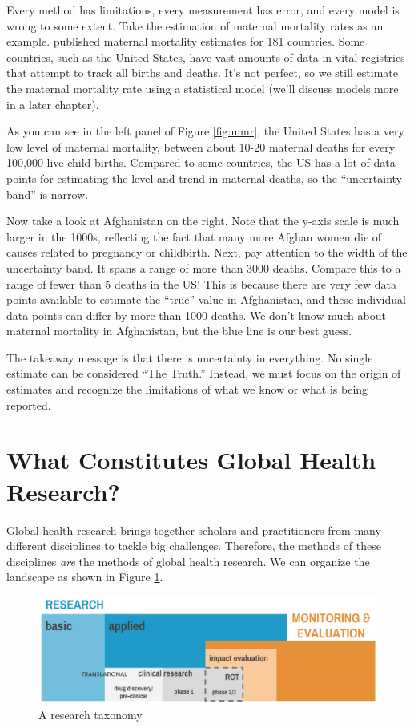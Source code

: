 \documentclass[justified,twoside,symmetric,]{tufte-book}
\renewcommand*{\citet}[1]{{\cite{#1}}}
\begin{document}
Every method has limitations, every measurement has error, and every model is wrong to some extent. Take the estimation of maternal mortality rates as an example. \citet{hogan:2010} published maternal mortality estimates for 181 countries. Some countries, such as the United States, have vast amounts of data in vital registries that attempt to track all births and deaths. It's not perfect, so we still estimate the maternal mortality rate using a statistical model (we'll discuss models more in a later chapter).

As you can see in the left panel of Figure \ref{fig:mmr}, the United States has a very low level of maternal mortality, between about 10-20 maternal deaths for every 100,000 live child births. Compared to some countries, the US has a lot of data points for estimating the level and trend in maternal deaths, so the ``uncertainty band'' is narrow.

Now take a look at Afghanistan on the right. Note that the y-axis scale is much larger in the 1000s, reflecting the fact that many more Afghan women die of causes related to pregnancy or childbirth. Next, pay attention to the width of the uncertainty band. It spans a range of more than 3000 deaths. Compare this to a range of fewer than 5 deaths in the US! This is because there are very few data points available to estimate the ``true'' value in Afghanistan, and these individual data points can differ by more than 1000 deaths. We don't know much about maternal mortality in Afghanistan, but the blue line is our best guess.

The takeaway message is that there is uncertainty in everything. No single estimate can be considered ``The Truth.'' Instead, we must focus on the origin of estimates and recognize the limitations of what we know or what is being reported.

\hypertarget{what-constitutes-global-health-research}{%
\section{What Constitutes Global Health Research?}\label{what-constitutes-global-health-research}}

Global health research brings together scholars and practitioners from many different disciplines to tackle big challenges. Therefore, the methods of these disciplines \emph{are} the methods of global health research. We can organize the landscape as shown in Figure \ref{fig:basicapplied}.

\begin{figure}
\includegraphics{images/basicapplied} \caption[A research taxonomy]{A research taxonomy}\label{fig:basicapplied}
\end{figure}
\end{document}
